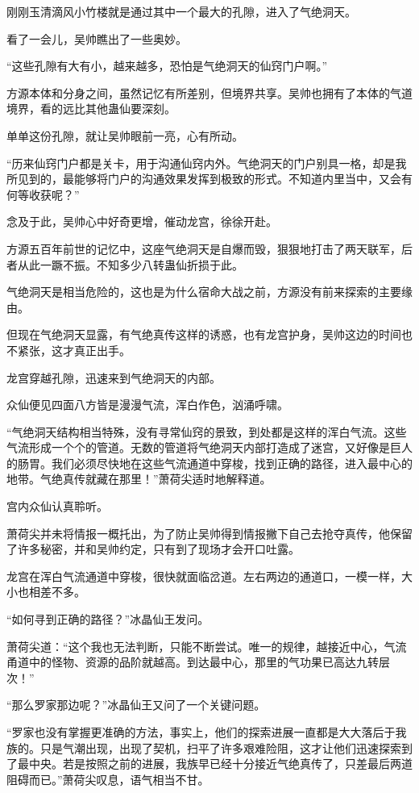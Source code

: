\begin{this_body}
刚刚玉清滴风小竹楼就是通过其中一个最大的孔隙，进入了气绝洞天。

看了一会儿，吴帅瞧出了一些奥妙。

“这些孔隙有大有小，越来越多，恐怕是气绝洞天的仙窍门户啊。”

方源本体和分身之间，虽然记忆有所差别，但境界共享。吴帅也拥有了本体的气道境界，看的远比其他蛊仙要深刻。

单单这份孔隙，就让吴帅眼前一亮，心有所动。

“历来仙窍门户都是关卡，用于沟通仙窍内外。气绝洞天的门户别具一格，却是我所见到的，最能够将门户的沟通效果发挥到极致的形式。不知道内里当中，又会有何等收获呢？”

念及于此，吴帅心中好奇更增，催动龙宫，徐徐开赴。

方源五百年前世的记忆中，这座气绝洞天是自爆而毁，狠狠地打击了两天联军，后者从此一蹶不振。不知多少八转蛊仙折损于此。

气绝洞天是相当危险的，这也是为什么宿命大战之前，方源没有前来探索的主要缘由。

但现在气绝洞天显露，有气绝真传这样的诱惑，也有龙宫护身，吴帅这边的时间也不紧张，这才真正出手。

龙宫穿越孔隙，迅速来到气绝洞天的内部。

众仙便见四面八方皆是漫漫气流，浑白作色，汹涌呼啸。

“气绝洞天结构相当特殊，没有寻常仙窍的景致，到处都是这样的浑白气流。这些气流形成一个个的管道。无数的管道将气绝洞天内部打造成了迷宫，又好像是巨人的肠胃。我们必须尽快地在这些气流通道中穿梭，找到正确的路径，进入最中心的地带。气绝真传就藏在那里！”萧荷尖适时地解释道。

宫内众仙认真聆听。

萧荷尖并未将情报一概托出，为了防止吴帅得到情报撇下自己去抢夺真传，他保留了许多秘密，并和吴帅约定，只有到了现场才会开口吐露。

龙宫在浑白气流通道中穿梭，很快就面临岔道。左右两边的通道口，一模一样，大小也相差不多。

“如何寻到正确的路径？”冰晶仙王发问。

萧荷尖道：“这个我也无法判断，只能不断尝试。唯一的规律，越接近中心，气流甬道中的怪物、资源的品阶就越高。到达最中心，那里的气功果已高达九转层次！”

“那么罗家那边呢？”冰晶仙王又问了一个关键问题。

“罗家也没有掌握更准确的方法，事实上，他们的探索进展一直都是大大落后于我族的。只是气潮出现，出现了契机，扫平了许多艰难险阻，这才让他们迅速探索到了最中央。若是按照之前的进展，我族早已经十分接近气绝真传了，只差最后两道阻碍而已。”萧荷尖叹息，语气相当不甘。


\end{this_body}
